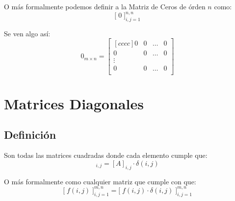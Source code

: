 \documentclass[12pt, fleqn]{report}                             %
\theoremstyle{break}                                            %
\newcommand{\BigBrackets}[1]{\Big[ \; #1 \; \Big]}              %
\begin{document}
                O más formalmente podemos definir a la Matriz de Ceros de órden $n$ como:
                \begin{equation*}
                    \BigBrackets{0}_{i, j = 1}^{n, n}
                \end{equation*}

                Se ven algo así:
                \begin{equation*}
                    0_{m \times n} =
                    \begin{bmatrix}[cccc]
                        0 & 0 & \dots & 0   \\
                        0 & 0 & \dots & 0   \\
                        \vdots              \\
                        0 & 0 & \dots & 0   \\
                    \end{bmatrix}
                \end{equation*}



        \clearpage
        \section{Matrices Diagonales}

            \subsection{Definición}

                Son todas las matrices cuadradas donde cada elemento cumple que:
                \begin{equation*}
                    [A]_{i,j} = [A]_{i,j} \cdot \delta(i,j)
                \end{equation*}

                O más formalmente como cualquier matriz que cumple con que:
                \begin{equation*}
                    \BigBrackets{f(i,j)}_{i, j = 1}^{m, n} 
                        =
                    \BigBrackets{f(i,j) \cdot \delta(i,j) }_{i, j = 1}^{m, n}  
                \end{equation*}
\end{document}
